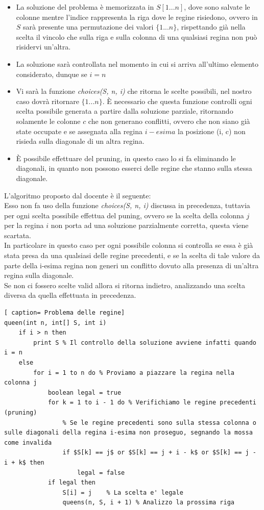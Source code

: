 \documentclass[../cheatSheetAlgoritmi.tex]{subfiles}
\begin{document}
\begin{itemize}
	\item La soluzione del problema è memorizzata in $S[1 ... n]$, dove sono salvate le colonne mentre l'indice rappresenta la riga dove le regine risiedono, ovvero in $S$ sarà presente una permutazione dei valori $\{1 ... n\}$, rispettando già nella scelta il vincolo che sulla riga e sulla colonna di una qualsiasi regina non può risidervi un'altra.
	\item La soluzione sarà controllata nel momento in cui si arriva all'ultimo elemento considerato, dunque se $i = n$
	\item Vi sarà la funzione \emph{choices(S, n, i)} che ritorna le scelte possibili, nel nostro caso dovrà ritornare $\{1 ... n\}$. È necessario che questa funzione controlli ogni scelta possibile generata a partire dalla soluzione parziale, ritornando solamente le colonne $c$ che non generano conflitti, ovvero che non siano già state occupate e se assegnata alla regina $i-esima$ la posizione (i, c) non risieda sulla diagonale di un altra regina.
	\item È possibile effettuare del pruning, in questo caso lo si fa eliminando le diagonali, in quanto non possono esserci delle regine che stanno sulla stessa diagonale.
\end{itemize}
L'algoritmo proposto dal docente è il seguente: \\
Esso non fa uso della funzione \emph{choices(S, n, i)} discussa in precedenza, tuttavia per ogni scelta possibile effettua del puning, ovvero se la scelta della colonna $j$ per la regina $i$ non porta ad una soluzione parzialmente corretta, questa viene scartata. \\
In particolare in questo caso per ogni possibile colonna si controlla se essa è già stata presa da una qualsiasi delle regine precedenti, e se la scelta di tale valore da parte della i-esima regina non generi un conflitto dovuto alla presenza di un'altra regina sulla diagonale. \\
Se non ci fossero scelte valid allora si ritorna indietro, analizzando una scelta diversa da quella effettuata in precedenza.
 \begin{lstlisting}[ caption= Problema delle regine]
queen(int n, int[] S, int i)
	if i > n then
		print S % Il controllo della soluzione avviene infatti quando i = n
	else 
		for i = 1 to n do % Proviamo a piazzare la regina nella colonna j
			boolean legal = true
			for k = 1 to i - 1 do % Verifichiamo le regine precedenti (pruning)
				% Se le regine precedenti sono sulla stessa colonna o sulle diagonali della regina i-esima non proseguo, segnando la mossa come invalida
				if $S[k] == j$ or $S[k] == j + i - k$ or $S[k] == j -  i + k$ then
					legal = false 
			if legal then
				S[i] = j	% La scelta e' legale
				queens(n, S, i + 1) % Analizzo la prossima riga
\end{lstlisting}
\end{document}
